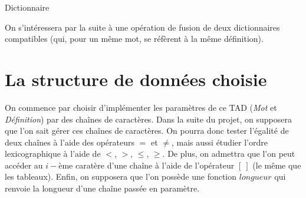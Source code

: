 \documentclass[a4paper, titlepage]{livret} %
\begin{document}
			\begin{tad}
				\tadDependances{\booleen}
				
				\begin{tadOperations}{Dictionnaire}
				\end{tadOperations}
				
				\begin{tadAxiomes}
				\end{tadAxiomes}
			\end{tad}

			On s'intéressera par la suite à une opération de fusion de deux dictionnaires \og compatibles \fg{} (qui, pour un même mot, se réfèrent à la même définition).

		\section{La structure de données choisie}
			On commence par choisir d'implémenter les paramètres de ce TAD (\textit{Mot} et \textit{Définition}) par des chaînes de caractères.
			Dans la suite du projet, on supposera que l'on sait gérer ces chaînes de caractères.
			On pourra donc tester l'égalité de deux chaînes à l'aide des opérateurs $=$ et $\neq$, mais aussi étudier l'ordre lexicographique à l'aide de $<$, $>$, $\leq$, $\geq$.
			De plus, on admettra que l'on peut accéder au $i-$ème caratère d'une chaîne à l'aide de l'opérateur $[\ ]$ (le même que les tableaux).
			Enfin, on supposera que l'on possède une fonction $longueur$ qui renvoie la longueur d'une chaîne passée en paramètre.
\end{document}
